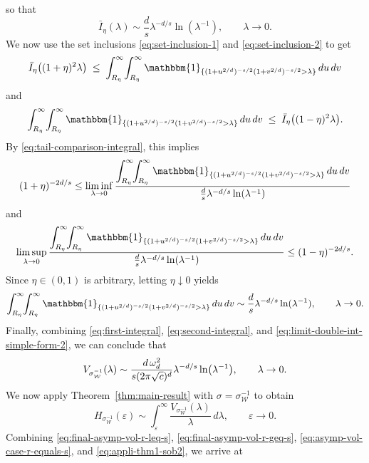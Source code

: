 \documentclass[a4paper,12pt]{article}
\let\originalleft\left
\let\originalright\right
\renewcommand{\left}{\mathopen{}\mathclose\bgroup\originalleft}
\renewcommand{\right}{\aftergroup\egroup\originalright}
\newcommand{\symbolnotsobw}{\symbolnot_{\mathcal{W}}}
\newcommand{\symbolnot}{\sigma}
\begin{document}
so that
\begin{equation}\label{eq:tail-comparison-integral}
\bar I_\eta(\lambda)
\sim
\frac{d}{s}\lambda^{-d/s}\ln(\lambda^{-1}),
\qquad \lambda\to0 .
\end{equation}
We now use the set inclusions \eqref{eq:set-inclusion-1} and
\eqref{eq:set-inclusion-2} to get
\[
\bar I_\eta \bigl((1+\eta)^2\lambda\bigr)
\;\le\;
\int_{R_\eta}^{\infty}\!\int_{R_\eta}^{\infty}
\mathbbm{1}_{\{(1+u^{2/d})^{-s/2}(1+v^{2/d})^{-s/2}>\lambda\}}
\,du\,dv
\]
and
\[
\int_{R_\eta}^{\infty}\!\int_{R_\eta}^{\infty}
\mathbbm{1}_{\{(1+u^{2/d})^{-s/2}(1+v^{2/d})^{-s/2}>\lambda\}}
\,du\,dv
\;\le\;
\bar I_\eta \bigl((1-\eta)^2\lambda\bigr).
\]
By \eqref{eq:tail-comparison-integral}, this implies
\[
(1+\eta)^{-2d/s}
\le
\liminf_{\lambda\to0}
\frac{
\displaystyle
\int_{R_\eta}^{\infty}\!\!\int_{R_\eta}^{\infty}
\mathbbm{1}_{\{(1+u^{2/d})^{-s/2}(1+v^{2/d})^{-s/2}>\lambda\}}
\,du\,dv
}{
\frac{d}{s}\lambda^{-d/s}\ln(\lambda^{-1})
}
\]
and
\[
\limsup_{\lambda\to0}
\frac{
\displaystyle
\int_{R_\eta}^{\infty}\!\!\int_{R_\eta}^{\infty}
\mathbbm{1}_{\{(1+u^{2/d})^{-s/2}(1+v^{2/d})^{-s/2}>\lambda\}}
\,du\,dv
}{
\frac{d}{s}\lambda^{-d/s}\ln(\lambda^{-1})
}
\le
(1-\eta)^{-2d/s}.
\]
Since $\eta\in(0,1)$ is arbitrary, letting $\eta\downarrow0$ yields
\begin{equation}\label{eq:limit-double-int-simple-form-2}
\int_{R_\eta}^{\infty}\!\!\int_{R_\eta}^{\infty}
\mathbbm{1}_{\{(1+u^{2/d})^{-s/2}(1+v^{2/d})^{-s/2}>\lambda\}}
\,du\,dv
\sim
\frac{d}{s}\lambda^{-d/s}\ln(\lambda^{-1}),
\qquad \lambda\to0.
\end{equation}
Finally, combining \eqref{eq:first-integral}, \eqref{eq:second-integral}, and \eqref{eq:limit-double-int-simple-form-2}, we can conclude that
\begin{equation}\label{eq:asymp-vol-case-r-equals-s}
V_{\symbolnotsobw^{-1}}(\lambda)
\sim
\frac{d\,\omega_d^2}{s(2\pi\sqrt{c})^{d}}
\lambda^{-d/s}\ln \left(\lambda^{-1}\right),
\qquad \lambda\to0.
\end{equation}
We now apply Theorem~\ref{thm:main-result} with
$\symbolnot=\symbolnotsobw^{-1}$ to obtain
\begin{equation}\label{eq:appli-thm1-sob2}
    H_{\symbolnotsobw^{-1}}(\varepsilon)
    \sim
    \int_\varepsilon^\infty
    \frac{V_{\symbolnotsobw^{-1}}(\lambda)}{\lambda}\,d\lambda,
    \qquad \varepsilon\to0.
\end{equation}
Combining \eqref{eq:final-asymp-vol-r-leq-s},
\eqref{eq:final-asymp-vol-r-geq-s},
\eqref{eq:asymp-vol-case-r-equals-s},
and \eqref{eq:appli-thm1-sob2}, we arrive at
\end{document}
